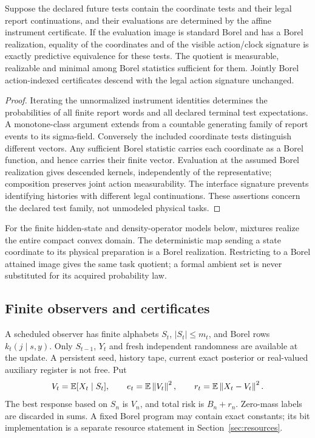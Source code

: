 \begin{lemma}\label{lem:quotient}
Suppose the declared future tests contain the coordinate tests and their legal report continuations, and their evaluations are determined by the affine instrument certificate. If the evaluation image is standard Borel and has a Borel realization, equality of the coordinates and of the visible action/clock signature is exactly predictive equivalence for these tests. The quotient is measurable, realizable and minimal among Borel statistics sufficient for them. Jointly Borel action-indexed certificates descend with the legal action signature unchanged.
\end{lemma}
\begin{proof}
Iterating the unnormalized instrument identities determines the probabilities of all finite report words and all declared terminal test expectations. A monotone-class argument extends from a countable generating family of report events to its sigma-field. Conversely the included coordinate tests distinguish different vectors. Any sufficient Borel statistic carries each coordinate as a Borel function, and hence carries their finite vector. Evaluation at the assumed Borel realization gives descended kernels, independently of the representative; composition preserves joint action measurability. The interface signature prevents identifying histories with different legal continuations. These assertions concern the declared test family, not unmodeled physical tasks.
\end{proof}
For the finite hidden-state and density-operator models below, mixtures realize the entire compact convex domain. The deterministic map sending a state coordinate to its physical preparation is a Borel realization. Restricting to a Borel attained image gives the same task quotient; a formal ambient set is never substituted for its acquired probability law.

\subsection{Finite observers and certificates}
A scheduled observer has finite alphabets $S_t$, $|S_t|\le m_t$, and Borel rows $k_t(j\mid s,y)$. Only $S_{t-1}$, $Y_t$ and fresh independent randomness are available at the update. A persistent seed, history tape, current exact posterior or real-valued auxiliary register is not free. Put
\[
 V_t=\mathbb E[X_t\mid S_t],\qquad e_t=\mathbb E\left\lVert V_t\right\rVert^2,
 \qquad r_t=\mathbb E\left\lVert X_t-V_t\right\rVert^2.
\]
The best response based on $S_n$ is $V_n$, and total risk is $B_n+r_n$. Zero-mass labels are discarded in sums. A fixed Borel program may contain exact constants; its bit implementation is a separate resource statement in Section~\ref{sec:resources}.

